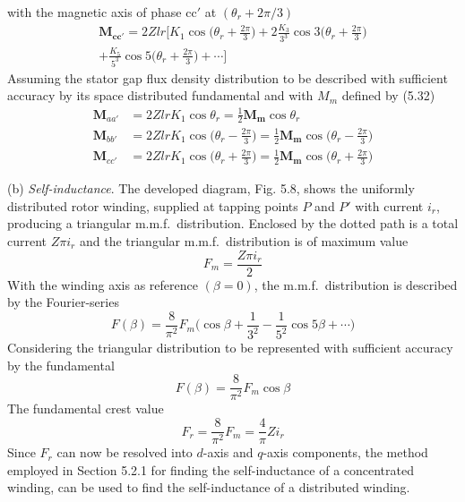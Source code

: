 \documentclass[a4paper,numbers=noenddot,12pt]{scrbook}
\begin{document}
with the magnetic axis of phase $\textrm{cc}'$ at $(\theta_r + 2 \pi / 3)$
\begin{multline*}
    \mathbf{M_{cc'}} = 2 Z l r \bigg[ K_1 \cos \bigg(\theta_r + \frac{2 \pi}{3} \bigg) + 2 \frac{K_3}{3^3} \cos 3 \bigg(\theta_r + \frac{2 \pi}{3} \bigg) \\
    + \frac{K_5}{5^3} \cos 5 \bigg( \theta_r + \frac{2 \pi}{3} \bigg ) + \cdots \bigg]
\end{multline*}
Assuming the stator gap flux density distribution to be described with sufficient accuracy by its space distributed fundamental and with $M_m$ defined by (5.32)
\begin{align}
    \boldsymbol M_{aa'} &= 2 Z l r K_1 \cos \theta_r = \frac{1}{2} \mathbf{M_{m}} \cos \theta_r \nonumber \\
    \boldsymbol M_{bb'} &= 2 Z l r K_1 \cos \bigg(\theta_r - \frac{2 \pi}{3} \bigg ) = \frac{1}{2} \mathbf{M_{m}} \cos \bigg( \theta_r - \frac{2\pi}{3} \bigg) \\
    \boldsymbol M_{cc'} &= 2 Z l r K_1 \cos \bigg( \theta_r + \frac{2 \pi}{3} \bigg) = \frac{1}{2} \mathbf{M_{m}} \cos \bigg( \theta_r + \frac{2 \pi}{3} \bigg) \nonumber
\end{align}

\noindent (b) \textit{Self-inductance}. The developed diagram, Fig. 5.8, shows the uniformly distributed rotor winding, supplied at tapping points $P$ and $P'$ with current $i_r$, producing a triangular m.m.f.\  distribution. Enclosed by the dotted path is a total current $Z \pi i_r$ and the triangular m.m.f.\ distribution is of maximum value
\begin{equation}
    F_m = \frac{Z \pi i_r}{2}
\end{equation}
With the winding axis as reference $(\beta = 0)$, the m.m.f.\ distribution is described by the Fourier-series
\begin{equation}
    F(\beta) = \frac{8}{\pi^2} F_m \bigg(\cos \beta + \frac{1}{3^2} - \frac{1}{5^2} \cos 5 \beta + \cdots)
\end{equation}
Considering the triangular distribution to be represented with sufficient accuracy by the fundamental
\begin{equation*}
    F(\beta) = \frac{8}{\pi^2}F_m \cos \beta
\end{equation*}
The fundamental crest value
\begin{equation}
    F_r = \frac{8}{\pi^2}F_m = \frac{4}{\pi} Z i_r
\end{equation}
Since $F_r$ can now be resolved into $d$-axis and $q$-axis components, the method employed in Section 5.2.1 for finding the self-inductance of a concentrated winding, can be used to find the self-inductance of a distributed winding.
\end{document}
